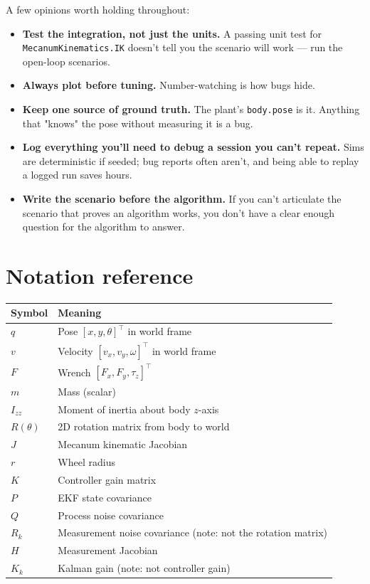 \documentclass[11pt,a4paper]{article}
\newcommand{\code}[1]{\texttt{\small #1}}
\newcommand{\Rmat}[1]{R(#1)}
\begin{document}
A few opinions worth holding throughout:

\begin{itemize}
    \item \textbf{Test the integration, not just the units.} A passing
        unit test for \code{MecanumKinematics.IK} doesn't tell you the
        scenario will work --- run the open-loop scenarios.
    \item \textbf{Always plot before tuning.} Number-watching is how
        bugs hide.
    \item \textbf{Keep one source of ground truth.} The plant's
        \code{body.pose} is it. Anything that "knows" the pose without
        measuring it is a bug.
    \item \textbf{Log everything you'll need to debug a session you
        can't repeat.} Sims are deterministic if seeded; bug reports
        often aren't, and being able to replay a logged run saves hours.
    \item \textbf{Write the scenario before the algorithm.} If you can't
        articulate the scenario that proves an algorithm works, you
        don't have a clear enough question for the algorithm to answer.
\end{itemize}

\appendix
\section{Notation reference}

\begin{tabular}{ll}
    \toprule
    Symbol & Meaning \\
    \midrule
    $q$ & Pose $[x, y, \theta]^\top$ in world frame \\
    $v$ & Velocity $[v_x, v_y, \omega]^\top$ in world frame \\
    $F$ & Wrench $[F_x, F_y, \tau_z]^\top$ \\
    $m$ & Mass (scalar) \\
    $I_{zz}$ & Moment of inertia about body $z$-axis \\
    $\Rmat{\theta}$ & 2D rotation matrix from body to world \\
    $J$ & Mecanum kinematic Jacobian \\
    $r$ & Wheel radius \\
    $K$ & Controller gain matrix \\
    $P$ & EKF state covariance \\
    $Q$ & Process noise covariance \\
    $R_k$ & Measurement noise covariance (note: not the rotation matrix) \\
    $H$ & Measurement Jacobian \\
    $K_k$ & Kalman gain (note: not controller gain) \\
    \bottomrule
\end{tabular}
\end{document}
